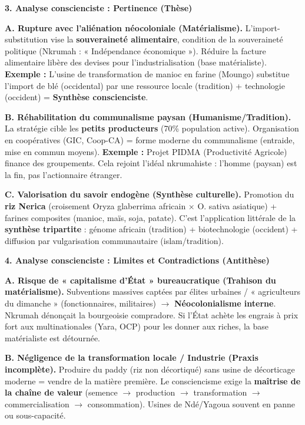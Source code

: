 \documentclass[11pt]{article}
\newcommand{\cle}[1]{{\popxbold\color{popdark}#1}}
\begin{document}
\begin{exoresolu}
\textbf{3. Analyse conscienciste : Pertinence (Thèse)}

\textbf{A. Rupture avec l'aliénation néocoloniale (Matérialisme).}
L'import-substitution vise la \textbf{souveraineté alimentaire}, condition de la souveraineté politique (Nkrumah : « Indépendance économique »). Réduire la facture alimentaire libère des devises pour l'industrialisation (base matérialiste). \textbf{Exemple :} L'usine de transformation de manioc en farine (Moungo) substitue l'import de blé (occidental) par une ressource locale (tradition) + technologie (occident) = \textbf{Synthèse conscienciste}.

\textbf{B. Réhabilitation du communalisme paysan (Humanisme/Tradition).}
La stratégie cible les \textbf{petits producteurs} (70\% population active). Organisation en coopératives (GIC, Coop-CA) = forme moderne du \cle{communalisme} (entraide, mise en commun moyens). \textbf{Exemple :} Projet PIDMA (Productivité Agricole) finance des groupements. Cela rejoint l'idéal nkrumahiste : l'homme (paysan) est la fin, pas l'actionnaire étranger.

\textbf{C. Valorisation du savoir endogène (Synthèse culturelle).}
Promotion du \textbf{riz Nerica} (croisement Oryza glaberrima africain $\times$ O. sativa asiatique) + farines composites (manioc, maïs, soja, patate). C'est l'application littérale de la \textbf{synthèse tripartite} : génome africain (tradition) + biotechnologie (occident) + diffusion par vulgarisation communautaire (islam/tradition).

\textbf{4. Analyse conscienciste : Limites et Contradictions (Antithèse)}

\textbf{A. Risque de « capitalisme d'État » bureaucratique (Trahison du matérialisme).}
Subventions massives captées par élites urbaines / « agriculteurs du dimanche » (fonctionnaires, militaires) $\rightarrow$ \textbf{Néocolonialisme interne}. Nkrumah dénonçait la bourgeoisie compradore. Si l'État achète les engrais à prix fort aux multinationales (Yara, OCP) pour les donner aux riches, la base matérialiste est détournée.

\textbf{B. Négligence de la transformation locale / Industrie (Praxis incomplète).}
Produire du paddy (riz non décortiqué) sans usine de décorticage moderne = vendre de la matière première. Le consciencisme exige la \textbf{maîtrise de la chaîne de valeur} (semence $\rightarrow$ production $\rightarrow$ transformation $\rightarrow$ commercialisation $\rightarrow$ consommation). Usines de Ndé/Yagoua souvent en panne ou sous-capacité.


\end{exoresolu}
\end{document}
